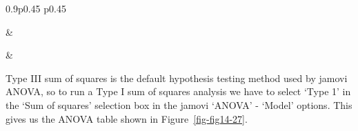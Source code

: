 \documentclass[
  a4paper,
]{book}
\begin{document}
\begin{table}[ht]
\caption{\label{tbl-tab14-18}And more possible null and alternative hypotheses with the outcome
variable `babble' }\tabularnewline

\begin{centerbox}
\begin{threeparttable}
\setlength{\tabcolsep}{0pt}
\begin{tabularx}{0.9\textwidth}{p{} p{}}



 &
 \tabularnewline[-0.5pt]



 &
 \tabularnewline[-0.5pt]


\end{tabularx} 

\end{threeparttable}\par\end{centerbox}

\end{table}
 

Type III sum of squares is the default hypothesis testing method used by
jamovi ANOVA, so to run a Type I sum of squares analysis we have to
select `Type 1' in the `Sum of squares' selection box in the jamovi
`ANOVA' - `Model' options. This gives us the ANOVA table shown in
Figure~\ref{fig-fig14-27}.
\end{document}
